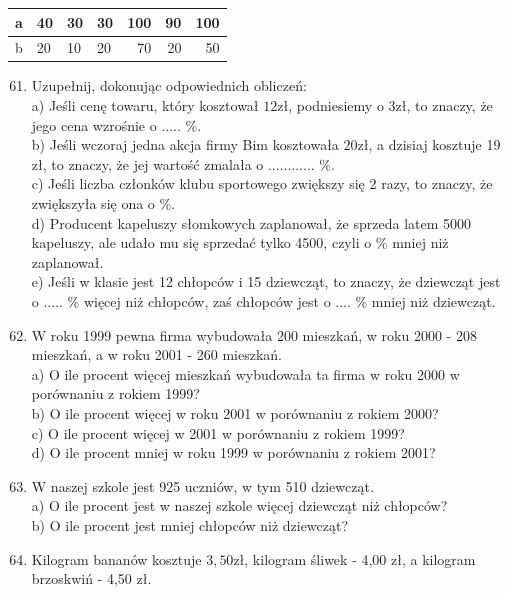 \documentclass[10pt]{article}
\begin{document}
\begin{center}
\begin{tabular}{|c|l|l|l|r|r|r|}
\hline
a & 40 & 30 & 30 & 100 & 90 & 100 \\
\hline
b & 20 & 10 & 20 & 70 & 20 & 50 \\
\hline
\end{tabular}
\end{center}

\begin{enumerate}
  \setcounter{enumi}{60}
  \item Uzupełnij, dokonując odpowiednich obliczeń:\\
a) Jeśli cenę towaru, który kosztował \(12 \mathrm{zł}\), podniesiemy o \(3 \mathrm{zł}\), to znaczy, że jego cena wzrośnie o ..... \%.\\
b) Jeśli wczoraj jedna akcja firmy Bim kosztowała \(20 \mathrm{zł}\), a dzisiaj kosztuje 19 zł, to znaczy, że jej wartość zmalała o ............ \(\%\).\\
c) Jeśli liczba członków klubu sportowego zwiększy się 2 razy, to znaczy, że zwiększyła się ona o \%.\\
d) Producent kapeluszy słomkowych zaplanował, że sprzeda latem 5000 kapeluszy, ale udało mu się sprzedać tylko 4500, czyli o \% mniej niż zaplanował.\\
e) Jeśli w klasie jest 12 chłopców i 15 dziewcząt, to znaczy, że dziewcząt jest o ..... \% więcej niż chłopców, zaś chłopców jest o .... \% mniej niż dziewcząt.
  \item W roku 1999 pewna firma wybudowała 200 mieszkań, w roku 2000 - 208 mieszkań, a w roku 2001 - 260 mieszkań.\\
a) O ile procent więcej mieszkań wybudowała ta firma w roku 2000 w porównaniu z rokiem 1999?\\
b) O ile procent więcej w roku 2001 w porównaniu z rokiem 2000?\\
c) O ile procent więcej w 2001 w porównaniu z rokiem 1999?\\
d) O ile procent mniej w roku 1999 w porównaniu z rokiem 2001?
  \item W naszej szkole jest 925 uczniów, w tym 510 dziewcząt.\\
a) O ile procent jest w naszej szkole więcej dziewcząt niż chłopców?\\
b) O ile procent jest mniej chłopców niż dziewcząt?
  \item Kilogram bananów kosztuje \(3,50 \mathrm{zł}\), kilogram śliwek - 4,00 zł, a kilogram brzoskwiń - 4,50 zł.\\

\end{enumerate}
\end{document}
